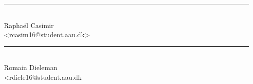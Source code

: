 \begin{center}

\begin{minipage}[b]{0.45\textwidth}
	\centering
	\rule{\textwidth}{0.5pt}\\
	Raphaël Casimir\\
	{\footnotesize <rcasim16@student.aau.dk>}
\end{minipage}
\hspace{0.3cm}
\begin{minipage}[b]{0.45\textwidth}
	\centering
	\rule{\textwidth}{0.5pt}\\
	Romain Dieleman\\
	{\footnotesize <rdiele16@student.aau.dk}
\end{minipage}



\end{center}
